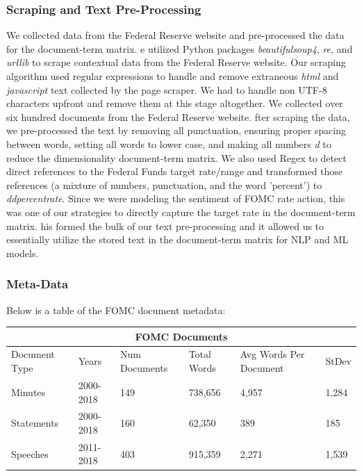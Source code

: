 \documentclass[11pt]{article}
\newcommand{\vertSpace}[1]{\vspace{3mm}}
\begin{document}
{\subsubsection{Scraping and Text Pre-Processing}

We collected data from the Federal Reserve website and pre-processed the data for the document-term matrix. \vertSpace


We utilized Python packages \textit{beautifulsoup4}, \textit{re}, and \textit{urllib} to scrape contextual data from the Federal Reserve website.  Our scraping algorithm used regular expressions to handle and remove extraneous \textit{html} and \textit{javascript} text collected by the page scraper.  We had to handle non UTF-8 characters upfront and remove them at this stage altogether.  We collected over six hundred documents from the Federal Reserve website. \vertSpace


After scraping the data, we pre-processed the text by removing all punctuation, ensuring proper spacing between words, setting all words to lower case, and making all numbers \textit{d} to reduce the dimensionality document-term matrix.  We also used Regex to detect direct references to the Federal Funds target rate/range and transformed those references (a mixture of numbers, punctuation, and the word 'percent') to \textit{ddpercentrate}.  Since we were modeling the sentiment of FOMC rate action, this was one of our strategies to directly capture the target rate in the document-term matrix. \vertSpace


This formed the bulk of our text pre-processing and it allowed us to essentially utilize the stored text in the document-term matrix for NLP and ML models. 

\subsubsection{Meta-Data}
\noindent Below is a table of the FOMC document metadata: 

\vertSpace

\noindent \begin{tabular}{ |p{2cm}||p{2cm}|p{2cm}|p{2cm}|p{2cm}|p{2cm}|  }
 \hline
 \multicolumn{6}{|c|}{FOMC Documents} \\
 \hline
 Document Type& Years & Num Documents & Total Words & Avg Words Per Document & StDev\\
 \hline
 Minutes   & 2000-2018    & 149 & 738,656 & 4,957 & 1,284\\
 Statements &   2000-2018  & 160   & 62,350 & 389 & 185\\
 Speeches & 2011-2018 & 403 & 915,359 & 2,271 & 1,539\\
 \hline
\end{tabular}

}
\end{document}
